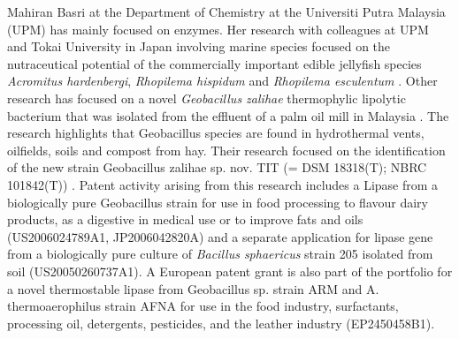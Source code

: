 \documentclass[]{book}
\theoremstyle{definition}
\theoremstyle{definition}
\theoremstyle{definition}
\theoremstyle{remark}
\begin{document}
\begin{enumerate}
{  Mahiran Basri} at the Department of Chemistry at the Universiti Putra
  Malaysia (UPM) has mainly focused on enzymes. Her research with
  colleagues at UPM and Tokai University in Japan involving marine
  species focused on the nutraceutical potential of the commercially
  important edible jellyfish species \emph{Acromitus hardenbergi},
  \emph{Rhopilema hispidum} and \emph{Rhopilema esculentum}
  \citep{Khong_2016}. Other research has focused on a novel
  \emph{Geobacillus zalihae} thermophylic lipolytic bacterium that was
  isolated from the effluent of a palm oil mill in Malaysia
  \citep{Rahman_2007}. The research highlights that Geobacillus species
  are found in hydrothermal vents, oilfields, soils and compost from
  hay. Their research focused on the identification of the new strain
  Geobacillus zalihae sp. nov. TIT (= DSM 18318(T); NBRC 101842(T))
  \citep{Khong_2016}. Patent activity arising from this research
  includes a Lipase from a biologically pure Geobacillus strain for use
  in food processing to flavour dairy products, as a digestive in
  medical use or to improve fats and oils (US2006024789A1,
  JP2006042820A) and a separate application for lipase gene from a
  biologically pure culture of \emph{Bacillus sphaericus} strain 205
  isolated from soil (US20050260737A1). A European patent grant is also
  part of the portfolio for a novel thermostable lipase from Geobacillus
  sp. strain ARM and A. thermoaerophilus strain AFNA for use in the food
  industry, surfactants, processing oil, detergents, pesticides, and the
  leather industry (EP2450458B1).
\end{enumerate}
\end{document}
